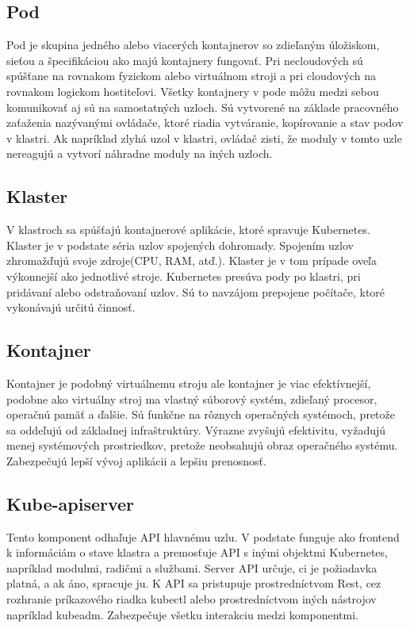 \subsection*{Pod}
Pod je skupina jedného alebo viacerých kontajnerov so zdieľaným úložiskom, sieťou a špecifikáciou ako majú kontajnery fungovať. Pri necloudových sú spúšťane na rovnakom fyzickom alebo virtuálnom stroji a pri cloudových na rovnakom logickom hostiteľovi. Všetky kontajnery v pode môžu medzi sebou komunikovať aj sú na samostatných uzloch. Sú vytvorené na základe pracovného zaťaženia nazývanými ovládače, ktoré riadia vytváranie, kopírovanie a stav podov v klastri. Ak napríklad zlyhá uzol v klastri, ovládač zisti, že moduly v tomto uzle nereagujú a vytvorí náhradne moduly na iných uzloch.

\subsection*{Klaster}
V klastroch sa spúšťajú kontajnerové aplikácie, ktoré spravuje Kubernetes. Klaster je v podstate séria uzlov spojených dohromady. Spojením uzlov zhromažďujú svoje zdroje(CPU, RAM, atď.). Klaster je v tom prípade oveľa výkonnejší ako jednotlivé stroje. Kubernetes presúva pody po klastri, pri pridávaní alebo odstraňovaní uzlov.\cite{kubernetes2} Sú to navzájom prepojene počítače, ktoré vykonávajú určitú činnosť.

\subsection*{Kontajner}
Kontajner je podobný virtuálnemu stroju ale kontajner je viac efektívnejší, podobne ako virtuálny stroj ma vlastný súborový systém, zdieľaný procesor, operačnú pamäť a ďalšie. Sú funkčne na rôznych operačných systémoch, pretože sa oddeľujú od základnej infraštruktúry.\cite{kubernetes}
Výrazne zvyšujú efektivitu, vyžadujú menej systémových prostriedkov, pretože neobsahujú obraz operačného systému. Zabezpečujú lepší vývoj aplikácii a lepšiu prenosnosť.

\subsection*{Kube-apiserver}
Tento komponent odhaľuje API hlavnému uzlu. V podstate funguje ako frontend k informáciám o stave klastra a premosťuje API s inými objektmi Kubernetes, napríklad modulmi, radičmi a službami. Server API určuje, ci je požiadavka platná, a ak áno, spracuje ju. K API sa pristupuje prostredníctvom Rest, cez rozhranie príkazového riadka kubectl alebo prostredníctvom iných nástrojov napríklad kubeadm. Zabezpečuje všetku interakciu medzi komponentmi.\cite{kubeapiserver}

